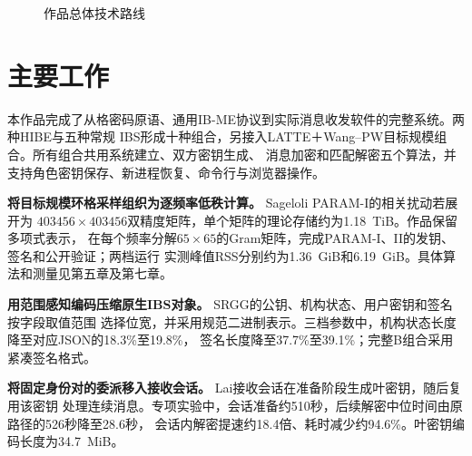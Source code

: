 \begin{figure}[H]
\centering
{}
\caption{作品总体技术路线}
\label{fig:work-overview}
\end{figure}

\section{主要工作}

本作品完成了从格密码原语、通用IB-ME协议到实际消息收发软件的完整系统。两种HIBE与五种常规
IBS形成十种组合，另接入LATTE＋Wang--PW目标规模组合。所有组合共用系统建立、双方密钥生成、
消息加密和匹配解密五个算法，并支持角色密钥保存、新进程恢复、命令行与浏览器操作。

\textbf{将目标规模环格采样组织为逐频率低秩计算。} Sageloli PARAM-I的相关扰动若展开为
$403456\times403456$双精度矩阵，单个矩阵的理论存储约为1.18~TiB。作品保留多项式表示，
在每个频率分解$65\times65$的Gram矩阵，完成PARAM-I、II的发钥、签名和公开验证；两档运行
实测峰值RSS分别约为1.36~GiB和6.19~GiB。具体算法和测量见第五章及第七章。

\textbf{用范围感知编码压缩原生IBS对象。} SRGG的公钥、机构状态、用户密钥和签名按字段取值范围
选择位宽，并采用规范二进制表示。三档参数中，机构状态长度降至对应JSON的18.3\%至19.8\%，
签名长度降至37.7\%至39.1\%；完整B组合采用紧凑签名格式。

\textbf{将固定身份对的委派移入接收会话。} Lai接收会话在准备阶段生成叶密钥，随后复用该密钥
处理连续消息。专项实验中，会话准备约510秒，后续解密中位时间由原路径的526秒降至28.6秒，
会话内解密提速约18.4倍、耗时减少约94.6\%。叶密钥编码长度为34.7~MiB。

